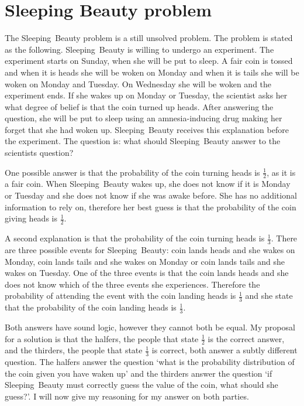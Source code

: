 \documentclass[twoside,a4paper]{article}
\theoremstyle{plain}
\theoremstyle{definition}
\theoremstyle{remark}
\numberwithin{equation}{section}
\DeclareMathOperator{\1}{\mathbbm{1}}
\begin{document}
\section{Sleeping Beauty problem}
The Sleeping~Beauty problem is a still unsolved problem. The problem is stated as the following. Sleeping~Beauty is willing to undergo an experiment. The experiment starts on Sunday, when she will be put to sleep. A fair coin is tossed and when it is heads she will be woken on Monday and when it is tails she will be woken on Monday and Tuesday. On Wednesday she will be woken and the experiment ends. If she wakes up on Monday or Tuesday, the scientist asks her what degree of belief is that the coin turned up heads. After answering the question, she will be put to sleep using an amnesia-inducing drug making her forget that she had woken up. Sleeping~Beauty receives this explanation before the experiment. The question is: what should Sleeping~Beauty answer to the scientists question?

One possible answer is that the probability of the coin turning heads is $\frac{1}{2}$, as it is a fair coin. When Sleeping~Beauty wakes up, she does not know if it is Monday or Tuesday and she does not know if she was awake before. She has no additional information to rely on, therefore her best guess is that the probability of the coin giving heads is $\frac{1}{2}$.

A second explanation is that the probability of the coin turning heads is $\frac{1}{3}$. There are three possible events for Sleeping~Beauty: coin lands heads and she wakes on Monday, coin lands tails and she wakes on Monday or coin lands tails and she wakes on Tuesday. One of the three events is that the coin lands heads and she does not know which of the three events she experiences. Therefore the probability of attending the event with the coin landing heads is $\frac{1}{3}$ and she state that the probability of the coin landing heads is $\frac{1}{3}$.

Both answers have sound logic, however they cannot both be equal. My proposal for a solution is that the halfers, the people that state $\frac{1}{2}$ is the correct answer, and the thirders, the people that state $\frac{1}{3}$ is correct, both answer a subtly different question. The halfers answer the question `what is the probability distribution of the coin given you have waken up' and the thirders answer the question `if Sleeping~Beauty must correctly guess the value of the coin, what should she guess?'. I will now give my reasoning for my answer on both parties.
\end{document}
